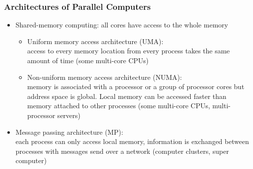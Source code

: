 \documentclass[aspectratio=169,11pt]{beamer}
\theoremstyle{definition}
\begin{document}
\begin{frame}
\frametitle<presentation>{Architectures of Parallel Computers}
\begin{itemize}
\item Shared-memory computing: all cores have access to the whole memory
\begin{itemize}
\item Uniform memory access architecture (UMA): \\
 access to every memory location from every process takes the
same amount of time (some multi-core CPUs)
\item Non-uniform memory access architecture (NUMA): \\
memory is associated with a processor or a group of processor cores but address space is
global. Local memory can be accessed faster than memory attached
to other processes (some multi-core CPUs, multi-processor servers)
\end{itemize}
\item Message passing architecture (MP): \\
 each process can only access local memory, information is exchanged
between processes with messages send over a network (computer clusters, super computer)
\end{itemize}
\end{frame}
\end{document}
